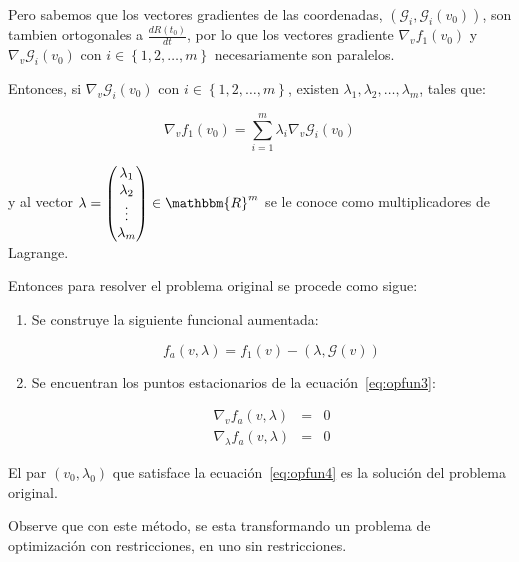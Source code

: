             Pero sabemos que los vectores gradientes de las coordenadas, $\left( \mathscr{G}_i, \mathscr{G}_i(v_0) \right)$, son tambien ortogonales a $\frac{d R(t_0)}{dt}$, por lo que los vectores gradiente $\nabla_v f_1(v_0)$ y $\nabla_v \mathscr{G}_i(v_0)$ con $i \in \left\{ 1, 2, \dots, m \right\}$ necesariamente son paralelos.

            Entonces, si $\nabla_v \mathscr{G}_i(v_0)$ con $i \in \left\{ 1, 2, \dots, m \right\}$, existen $\lambda_1, \lambda_2, \dots, \lambda_m$, tales que:

            \begin{equation}
                \nabla_v f_1(v_0) = \sum_{i=1}^m \lambda_i \nabla_v \mathscr{G}_i(v_0)
            \end{equation}

            y al vector $\lambda = \begin{pmatrix} \lambda_1 \\ \lambda_2 \\ \vdots \\ \lambda_m \end{pmatrix} \in \mathbbm{R}^m$ se le conoce como multiplicadores de Lagrange.

            Entonces para resolver el problema original se procede como sigue:

            \begin{enumerate}
                \item Se construye la siguiente funcional aumentada:

                \begin{equation}\label{eq:opfun3}
                    f_a(v, \lambda) = f_1(v) - \left( \lambda, \mathscr{G}(v) \right)
                \end{equation}

                \item Se encuentran los puntos estacionarios de la ecuación~\ref{eq:opfun3}:

                \begin{eqnarray}\label{eq:opfun4}
                    \nabla_v f_a(v, \lambda) & = & 0 \nonumber \\
                    \nabla_\lambda f_a(v, \lambda) & = & 0
                \end{eqnarray}
            \end{enumerate}

            El par $(v_0, \lambda_0)$ que satisface la ecuación~\ref{eq:opfun4} es la solución del problema original.

            Observe que con este método, se esta transformando un problema de optimización con restricciones, en uno sin restricciones.
